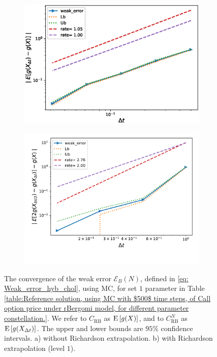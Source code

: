\begin{figure}[h!]
	\centering
	\begin{subfigure}{.4\textwidth}
		\centering
		\includegraphics[width=1\linewidth]{./figures/rBergomi_weak_error_rates/without_richardson/H_007/weak_convergence_order_Bergomi_H_007_K_1_M_10_6_CI_relative}
		\caption{}
		\label{fig:sub3}
	\end{subfigure}%
	\begin{subfigure}{.4\textwidth}
		\centering
		\includegraphics[width=1\linewidth]{./figures/rBergomi_weak_error_rates/with_richardson/H_007/weak_convergence_order_Bergomi_H_007_K_1_richardson_relative_M_10_6}
		\caption{}
		\label{fig:sub4}
	\end{subfigure}
	
	\caption{The  convergence of the weak error $\mathcal{E}_B(N)$, defined in \eqref{eq: Weak_error_hyb_chol}, using MC, for set $1$ parameter in Table \ref{table:Reference solution, using MC with $500$ time steps, of Call option price under rBergomi model, for different parameter constellation.}. We refer to $C_{\text{RB}}$ as $\mathrm{E}\left[g(X)\right]$, and to $C_{\text{RB}}^{N}$ as  $\mathrm{E}\left[g(X_{\Delta t})\right]$. The upper and lower bounds are $95\%$ confidence intervals. a) without Richardson extrapolation.  b) with Richardson extrapolation (level $1$).}
	\label{fig:Weak_rate_set1_set_2_without_rich}
\end{figure}
\FloatBarrier


